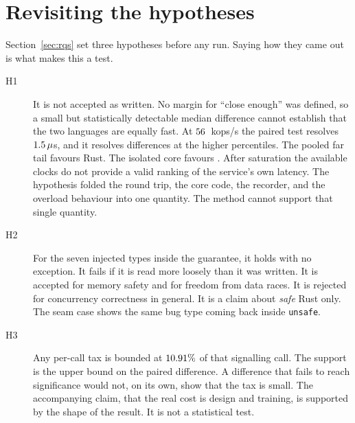 \documentclass[english,oneside,a4paper,censored,csm,software-track-2020]{HYthesisML}
\begin{document}
\section{Revisiting the hypotheses}\label{sec:hypotheses}
Section~\ref{sec:rqs} set three hypotheses before any run.
Saying how they came out is what makes this a test.

\begin{description}
  \item[H1] It is not accepted as written.
        No margin for ``close enough'' was defined, so a small but statistically detectable median difference cannot establish that the two languages are equally fast.
        At $56$~kops/s the paired test resolves $1.5\,\mu$s, and it resolves differences at the higher percentiles.
        The pooled far tail favours Rust.
        The isolated core favours \BudgetCoreFaster{}.
        After saturation the available clocks do not provide a valid ranking of the service's own latency.
        The hypothesis folded the round trip, the core code, the recorder, and the overload behaviour into one quantity.
        The method cannot support that single quantity.
  \item[H2] For the seven injected types inside the guarantee, it holds with no exception.
        It fails if it is read more loosely than it was written.
        It is accepted for memory safety and for freedom from data races.
        It is rejected for concurrency correctness in general.
        It is a claim about \emph{safe} Rust only.
        The seam case shows the same bug type coming back inside \texttt{unsafe}.
  \item[H3] Any per-call tax is bounded at $10.91\%$ of that signalling call.
        The support is the upper bound on the paired difference.
        A difference that fails to reach significance would not, on its own, show that the tax is small.
        The accompanying claim, that the real cost is design and training, is supported by the shape of the result. It is not a statistical test.
\end{description}
\end{document}
